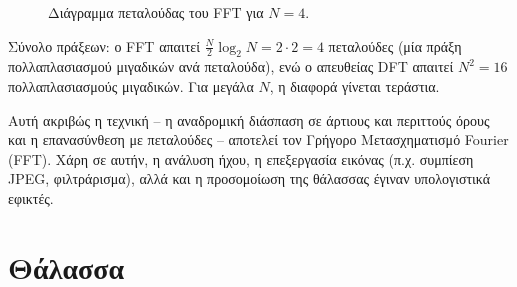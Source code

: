 \documentclass[a4paper, 11pt]{article}
\begin{document}
\begin{figure}[htbp]
\caption{Διάγραμμα πεταλούδας του FFT για $N=4$.}
\label{fig:fft_butterfly_n4}
\end{figure}

Σύνολο πράξεων: ο FFT απαιτεί \(\frac{N}{2} \log_2 N = 2 \cdot 2 = 4\)
πεταλούδες (μία πράξη πολλαπλασιασμού μιγαδικών ανά πεταλούδα), ενώ ο
απευθείας DFT απαιτεί \(N^2 = 16\) πολλαπλασιασμούς μιγαδικών. Για
μεγάλα \(N\), η διαφορά γίνεται τεράστια.

Αυτή ακριβώς η τεχνική -- η αναδρομική διάσπαση σε άρτιους και περιττούς
όρους και η επανασύνθεση με πεταλούδες -- αποτελεί τον Γρήγορο
Μετασχηματισμό Fourier (FFT). Χάρη σε αυτήν, η ανάλυση ήχου, η
επεξεργασία εικόνας (π.χ. συμπίεση JPEG, φιλτράρισμα), αλλά και η
προσομοίωση της θάλασσας έγιναν υπολογιστικά εφικτές.

\section{Θάλασσα}\label{ux3b8ux3acux3bbux3b1ux3c3ux3c3ux3b1}
\end{document}

